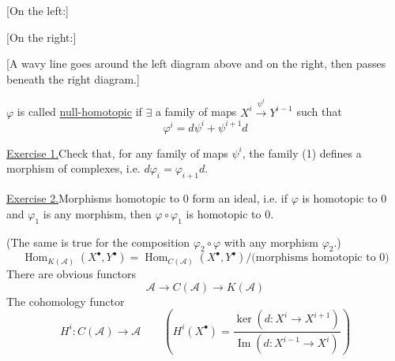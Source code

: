 [On the left:]
\begin{center}
\end{center}
[On the right:]
\begin{center}
\end{center}
[A wavy line goes around the left diagram above and on the right, then passes beneath the right diagram.]

$\varphi$ is called \underline{null-homotopic} if $\exists$ a family of maps
$X^i\overset{\psi^i}{\longrightarrow}Y^{i-1}$
such that
\begin{equation*}
\varphi^i=d\psi^i+\psi^{i+1}d\tag{1}
\end{equation*}


\underline{Exercise 1.}\quad Check that, for any family of maps $\psi^i$, the family (1)
defines a morphism of complexes, i.e. $d\varphi_i=\varphi_{i+1}d$.

\underline{Exercise 2.}\quad Morphisms homotopic to $0$ form an ideal, i.e. if
$\varphi$ is homotopic to $0$ and $\varphi_1$ is any morphism, then
$\varphi\circ\varphi_1$ is homotopic to $0$.

(The same is true for the composition $\varphi_2\circ\varphi$ with any morphism $\varphi_2$.)
\begin{equation*}
\operatorname{Hom}_{K(\mathcal A)}(X^\bullet,Y^\bullet)
=\operatorname{Hom}_{C(\mathcal A)}(X^\bullet,Y^\bullet)
/\bigl(\text{morphisms homotopic to }0\bigr)
\end{equation*}
There are obvious functors
\begin{equation*}
\mathcal A\longrightarrow C(\mathcal A)\longrightarrow K(\mathcal A)
\end{equation*}
The cohomology functor
\begin{equation*}
H^i\colon C(\mathcal A)\longrightarrow\mathcal A\qquad
\left(H^i(X^\bullet)=
\frac{\ker(d\colon X^i\longrightarrow X^{i+1})}
{\operatorname{Im}(d\colon X^{i-1}\longrightarrow X^i)}\right)
\end{equation*}


